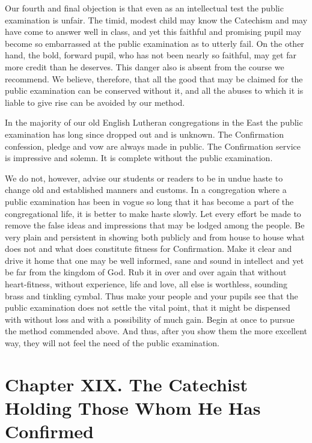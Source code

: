 Our fourth and final objection is that even as an intellectual test the public examination is unfair.  The timid, modest child may know the Catechism and may have come to answer well in class, and yet this faithful and promising pupil may become so embarrassed at the public examination as to utterly fail. On the other hand, the bold, forward pupil, who has not been nearly so faithful, may get far more credit than he deserves. This danger also is absent from the course we recommend. We believe, therefore, that all the good that may be claimed for the public examination can be conserved without it, and all the abuses to which it is liable to give rise can be avoided by our method. 

In the majority of our old English Lutheran congregations in the East the public examination has long since dropped out and is unknown. The Confirmation confession, pledge and vow are always made in public. The Confirmation service is impressive and solemn. It is complete without the public examination. 

We do not, however, advise our students or readers to be in undue haste to change old and established manners and customs.  In a congregation where a public examination has been in vogue so
long that it has become a part of the congregational life, it is better to make haste slowly. Let every effort be made to remove the false ideas and impressions that may be lodged among the people. Be very plain and persistent in showing both publicly and from house to house what does not and what does constitute fitness for Confirmation. Make it clear and drive it home that one may be well informed, sane and sound in intellect and yet be far from the kingdom of God. Rub it in over and over again that without heart-fitness, without experience, life and love, all else is worthless, sounding brass and tinkling cymbal. Thus make your people and your pupils see that the public examination does not settle the vital point, that it might be dispensed with without loss and with a possibility of much gain. Begin at once to pursue the method commended above. And thus, after you show them the more excellent way, they will not feel the need of the public examination.

\chapter[Chapter XIX. Those Whom He Has Confirmed]{Chapter XIX. The Catechist Holding Those Whom He Has Confirmed}

